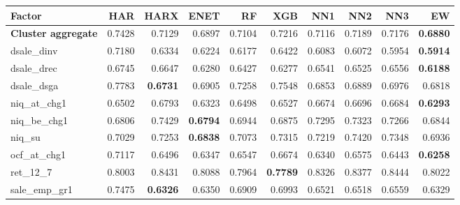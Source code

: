 \begin{longtable}{>{\raggedright\arraybackslash}p{2.6cm}rrrrrrrrr}
\hline
Factor & HAR & HARX & ENET & RF & XGB & NN1 & NN2 & NN3 & EW \\
\hline
\textbf{Cluster aggregate} & 0.7428 & \cellcolor{blue!10}0.7129 & \cellcolor{blue!10}0.6897 & \cellcolor{blue!10}0.7104 & \cellcolor{blue!10}0.7216 & \cellcolor{blue!10}0.7116 & \cellcolor{blue!10}0.7189 & \cellcolor{blue!10}0.7176 & \textbf{\cellcolor{blue!10}0.6880} \\
dsale\_dinv & 0.7180 & \cellcolor{blue!10}0.6334 & \cellcolor{blue!10}0.6224 & \cellcolor{blue!10}0.6177 & \cellcolor{blue!10}0.6422 & \cellcolor{blue!10}0.6083 & \cellcolor{blue!10}0.6072 & \cellcolor{blue!10}0.5954 & \textbf{\cellcolor{blue!10}0.5914} \\
dsale\_drec & 0.6745 & \cellcolor{blue!10}0.6647 & \cellcolor{blue!10}0.6280 & \cellcolor{blue!10}0.6427 & \cellcolor{blue!10}0.6277 & \cellcolor{blue!10}0.6541 & \cellcolor{blue!10}0.6525 & \cellcolor{blue!10}0.6556 & \textbf{\cellcolor{blue!10}0.6188} \\
dsale\_dsga & 0.7783 & \textbf{\cellcolor{blue!10}0.6731} & \cellcolor{blue!10}0.6905 & \cellcolor{blue!10}0.7258 & \cellcolor{blue!10}0.7548 & \cellcolor{blue!10}0.6853 & \cellcolor{blue!10}0.6889 & \cellcolor{blue!10}0.6976 & \cellcolor{blue!10}0.6818 \\
niq\_at\_chg1 & 0.6502 & 0.6793 & \cellcolor{blue!10}0.6323 & \cellcolor{blue!10}0.6498 & 0.6527 & 0.6674 & 0.6696 & 0.6684 & \textbf{\cellcolor{blue!10}0.6293} \\
niq\_be\_chg1 & 0.6806 & 0.7429 & \textbf{\cellcolor{blue!10}0.6794} & 0.6944 & 0.6875 & 0.7295 & 0.7323 & 0.7266 & 0.6844 \\
niq\_su & 0.7029 & 0.7253 & \textbf{\cellcolor{blue!10}0.6838} & 0.7073 & 0.7315 & 0.7219 & 0.7420 & 0.7348 & \cellcolor{blue!10}0.6936 \\
ocf\_at\_chg1 & 0.7117 & \cellcolor{blue!10}0.6496 & \cellcolor{blue!10}0.6347 & \cellcolor{blue!10}0.6547 & \cellcolor{blue!10}0.6674 & \cellcolor{blue!10}0.6340 & \cellcolor{blue!10}0.6575 & \cellcolor{blue!10}0.6443 & \textbf{\cellcolor{blue!10}0.6258} \\
ret\_12\_7 & 0.8003 & 0.8431 & 0.8088 & \cellcolor{blue!10}0.7964 & \textbf{\cellcolor{blue!10}0.7789} & 0.8326 & 0.8377 & 0.8444 & 0.8022 \\
sale\_emp\_gr1 & 0.7475 & \textbf{\cellcolor{blue!10}0.6326} & \cellcolor{blue!10}0.6350 & \cellcolor{blue!10}0.6909 & \cellcolor{blue!10}0.6993 & \cellcolor{blue!10}0.6521 & \cellcolor{blue!10}0.6518 & \cellcolor{blue!10}0.6559 & \cellcolor{blue!10}0.6329 \\

\end{longtable}
